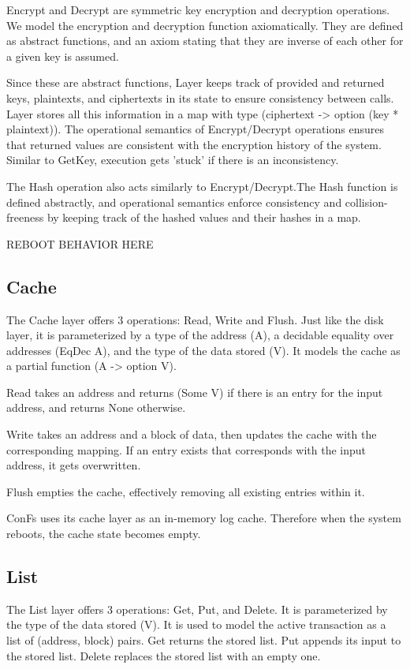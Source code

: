 Encrypt and Decrypt are symmetric key encryption and decryption operations.
We model the encryption and decryption function axiomatically. They are defined as abstract functions, and an axiom stating that they are inverse of each other for a given key is assumed.

Since these are abstract functions, Layer keeps track of provided and returned keys, plaintexts, and ciphertexts in its state to ensure consistency between calls. Layer stores all this information in a map with type (ciphertext -> option (key  * plaintext)). The operational semantics of Encrypt/Decrypt operations ensures that returned values are consistent with the encryption history of the system. Similar to GetKey, execution gets 'stuck' if there is an inconsistency. 

The Hash operation also acts similarly to Encrypt/Decrypt.The Hash function is defined abstractly, and operational semantics enforce consistency and collision-freeness by keeping track of the hashed values and their hashes in a map.

{\color{red} REBOOT BEHAVIOR HERE}

\subsection{Cache}
The Cache layer offers 3 operations: Read, Write and Flush. Just like the disk layer, it is parameterized by a type of the address (A), a decidable equality over addresses (EqDec A), and the type of the data stored (V). It models the cache as a partial function (A -> option V).

Read takes an address and returns (Some V) if there is an entry for the input address, and returns None otherwise.

Write takes an address and a block of data, then updates the cache with the corresponding mapping. If an entry exists that corresponds with the input address, it gets overwritten.

Flush empties the cache, effectively removing all existing entries within it.

ConFs uses its cache layer as an in-memory log cache. Therefore when the system reboots, the cache state becomes empty.

\subsection{List}
The List layer offers 3 operations: Get, Put, and Delete. It is parameterized by the type of the data stored (V). It is used to model the active transaction as a list of (address, block) pairs. Get returns the stored list. Put appends its input to the stored list. Delete replaces the stored list with an empty one. 

